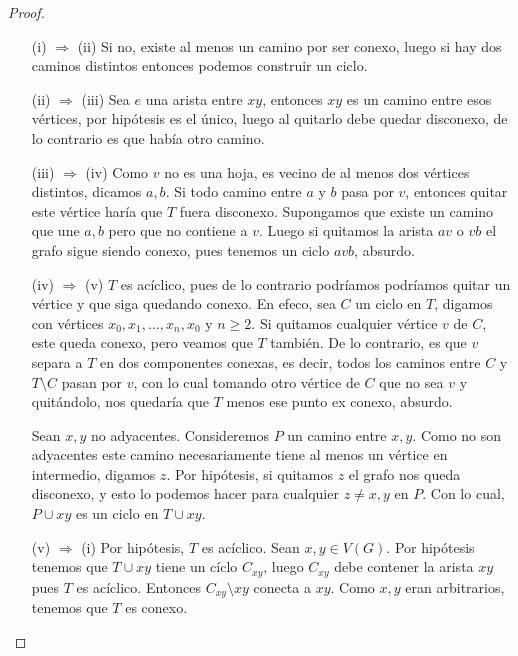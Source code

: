 \documentclass[12pt]{report}
\theoremstyle{plain}
\theoremstyle{definition}
\begin{document}
\begin{proof}
\begin{enumerate}
\item[]

\item[(i) $\Rightarrow$ (ii)] Si no, existe al menos un camino por ser conexo, luego si hay dos caminos distintos entonces podemos construir un ciclo.

\item[(ii) $\Rightarrow$ (iii)] Sea $e$ una arista entre $xy$, entonces $xy$ es un camino entre esos vértices, por hipótesis es el único, luego al quitarlo debe quedar disconexo, de lo contrario es que había otro camino.

\item[(iii) $\Rightarrow$ (iv)] Como $v$ no es una hoja, es vecino de al menos dos vértices distintos, dicamos $a,b$. Si todo camino entre $a$ y $b$ pasa por $v$, entonces quitar este vértice haría que $T$ fuera disconexo. Supongamos que existe un camino que une $a,b$ pero que no contiene a $v$. Luego si quitamos la arista $av$ o $vb$ el grafo sigue siendo conexo, pues tenemos un ciclo $a v b$, absurdo.

\item[(iv) $\Rightarrow$ (v)] $T$ es acíclico, pues de lo contrario podríamos podríamos quitar un vértice y que siga quedando conexo. En efeco, sea $C$ un ciclo en $T$, digamos con vértices $x_0,x_1,\ldots,x_n,x_0$ y $n \geq 2$. Si quitamos cualquier vértice $v$ de $C$, este queda conexo, pero veamos que $T$ también. De lo contrario, es que $v$ separa a $T$ en dos componentes conexas, es decir, todos los caminos entre $C$ y $T \setminus C$ pasan por $v$, con lo cual tomando otro vértice de $C$ que no sea $v$ y quitándolo, nos quedaría que $T$ menos ese punto ex conexo, absurdo.

Sean $x,y$ no adyacentes. Consideremos $P$ un camino entre $x,y$. Como no son adyacentes este camino necesariamente tiene al menos un vértice en intermedio, digamos $z$. Por hipótesis, si quitamos $z$ el grafo nos queda disconexo, y esto lo podemos hacer para cualquier $z \neq x,y$ en $P$. Con lo cual, $P \cup xy$ es un ciclo en $T \cup xy$.

\item[(v) $\Rightarrow$ (i)] Por hipótesis, $T$ es acíclico. Sean $x,y \in V(G)$. Por hipótesis tenemos que $T \cup xy$ tiene un cíclo $C_{xy}$, luego $C_{xy}$ debe contener la arista $xy$ pues $T$ es acíclico. Entonces $C_{xy} \setminus xy$ conecta a $xy$. Como $x,y$ eran arbitrarios, tenemos que $T$ es conexo.
\end{enumerate}
\end{proof}
\end{document}
